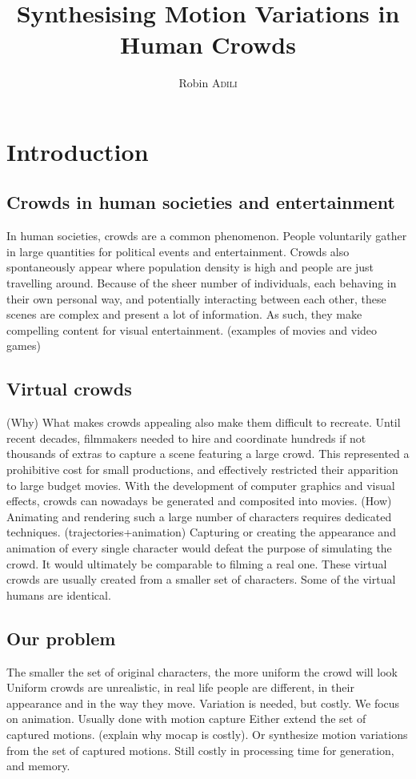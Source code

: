 \documentclass[11pt]{sdm_internship}
\title{Synthesising Motion Variations in Human Crowds}
\author{Robin \textsc{Adili}}
\begin{document}
\maketitle


\section{Introduction}

\subsection{Crowds in human societies and entertainment}
In human societies, crowds are a common phenomenon. People voluntarily gather in large quantities for political events and entertainment. Crowds also spontaneously appear where population density is high and people are just travelling around. 
Because of the sheer number of individuals, each behaving in their own personal way, and potentially interacting between each other, these scenes are complex and present a lot of information.
As such, they make compelling content for visual entertainment.
(examples of movies and video games)

\subsection{Virtual crowds}
(Why)
What makes crowds appealing also make them difficult to recreate. Until recent decades, filmmakers needed to hire and coordinate hundreds if not thousands of extras to capture a scene featuring a large crowd. This represented a prohibitive cost for small productions, and effectively restricted their apparition to large budget movies.
With the development of computer graphics and visual effects, crowds can nowadays be generated and composited into movies.
(How)
Animating and rendering such a large number of characters requires dedicated techniques.
(trajectories+animation)
Capturing or creating the appearance and animation of every single character would defeat the purpose of simulating the crowd. It would ultimately be comparable to filming a real one.
These virtual crowds are usually created from a smaller set of characters. Some of the virtual humans are identical.

\subsection{Our problem}
The smaller the set of original characters, the more uniform the crowd will look
Uniform crowds are unrealistic, in real life people are different, in their appearance and in the way they move.
Variation is needed, but costly.
We focus on animation. Usually done with motion capture
Either extend the set of captured motions. (explain why mocap is costly). 
Or synthesize motion variations from the set of captured motions. Still costly in processing time for generation, and memory.
\end{document}
